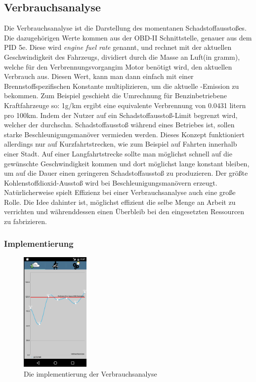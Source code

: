 \subsection{Verbrauchsanalyse}

Die Verbrauchsanalyse ist die Darstellung des momentanen Schadstoffausstoßes.
Die dazugehörigen Werte kommen aus der OBD-II Schnittstelle, genauer aus dem PID 5e.
Diese wird \textit{engine fuel rate} genannt, und rechnet mit der 
aktuellen Geschwindigkeit des Fahrzeugs, dividiert durch die Masse an Luft(in gramm), 
welche für den Verbrennungsvorgangim Motor benötigt wird,
den aktuellen Verbrauch aus. Diesen Wert, kann man dann einfach mit einer Brennstoffspezifischen
Konstante multiplizieren, um die aktuelle -Emission zu bekommen.
Zum Beispiel geschieht die Umrechnung für Benzinbetriebene Kraftfahrzeuge so:
1g/km  ergibt eine equivalente Verbrennung von 0.0431 litern pro 100km. 
Indem der Nutzer auf ein Schadstoffausstoß-Limit begrenzt wird, welcher der durchschn.
Schadstoffausstoß während eines Betriebes ist, sollen starke Beschleunigungsmanöver 
vermieden werden. Dieses Konzept funktioniert allerdings nur auf Kurzfahrtstrecken,
wie zum Beispiel auf Fahrten innerhalb einer Stadt.
Auf einer Langfahrtstrecke sollte man möglichst schnell auf die gewünschte Geschwindigkeit kommen
und dort möglichst lange konstant bleiben, um auf die Dauer einen geringeren Schadstoffausstoß zu produzieren.
Der größte Kohlenstoffdioxid-Ausstoß wird bei Beschleunigungsmanövern erzeugt.
Natürlicherweise spielt Effizienz bei einer Verbrauchsanalyse auch eine große Rolle.
Die Idee dahinter ist, möglichst effizient die selbe Menge an Arbeit zu verrichten und währenddessen einen Überbleib
bei den eingesetzten Ressourcen zu fabrizieren. 




\subsubsection{Implementierung}

\begin{figure}
    \centering
    \includegraphics[width=0.3\textwidth]{images/verbrauch}
    \caption{Die implementierung der Verbrauchsanalyse \cite{BOZH.ch3-verbrauchsanalyse.verbrauch}}
\end{figure}


